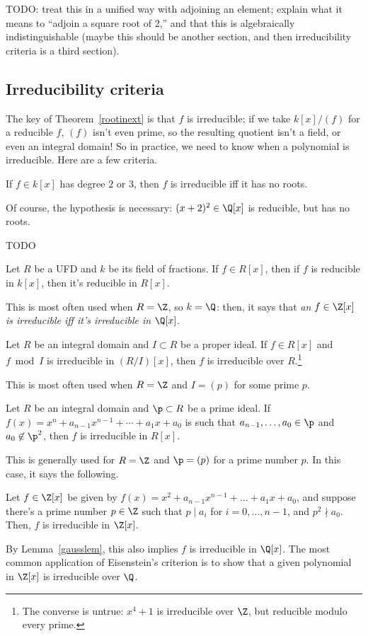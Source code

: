{\color{red}TODO}: treat this in a unified way with adjoining an element; explain what it means to ``adjoin a
square root of $2$,'' and that this is algebraically indistinguishable (maybe this should be another section, and
then irreducibility criteria is a third section).

\subsection*{Irreducibility criteria}
The key of Theorem~\ref{rootinext} is that $f$ is irreducible; if we take $k[x]/(f)$ for a reducible $f$,
$(f)$ isn't even prime, so the resulting quotient isn't a field, or even an integral domain! So in practice, we
need to know when a polynomial is irreducible. Here are a few criteria.
\begin{lem}
\label{cubirred}
If $f\in k[x]$ has degree $2$ or $3$, then $f$ is irreducible iff it has no roots.
\end{lem}
Of course, the hypothesis is necessary: $(x+2)^2\in\Q[x]$ is reducible, but has no roots.
\begin{thm}
{\color{red}TODO}
\end{thm}
\begin{lem}
\label{gausslem}
Let $R$ be a UFD and $k$ be its field of fractions. If $f\in R[x]$, then if $f$ is reducible in $k[x]$, then it's
reducible in $R[x]$.
\end{lem}
This is most often used when $R = \Z$, so $k = \Q$: then, it says that \emph{an $f\in\Z[x]$ is irreducible iff it's
irreducible in $\Q[x]$}.
\begin{prop}
Let $R$ be an integral domain and $I\subset R$ be a proper ideal. If $f\in R[x]$ and $f\bmod I$ is irreducible in
$(R/I)[x]$, then $f$ is irreducible over $R$.\footnote{The converse is untrue: $x^4+1$ is irreducible over $\Z$,
but reducible modulo every prime.}
\end{prop}
This is most often used when $R = \Z$ and $I = (p)$ for some prime $p$.
\begin{prop}
Let $R$ be an integral domain and $\p\subset R$ be a prime ideal. If $f(x) = x^n + a_{n-1}x^{n-1} + \dotsb + a_1x +
a_0$ is such that $a_{n-1},\dotsc,a_0\in\p$ and $a_0\not\in\p^2$, then $f$ is irreducible in $R[x]$.
\end{prop}
This is generally used for $R = \Z$ and $\p = (p)$ for a prime number $p$. In this case, it says the following.
\begin{coro}
Let $f\in\Z[x]$ be given by $f(x) = x^2 + a_{n-1}x^{n-1} + \dotsc + a_1x + a_0$, and suppose there's a prime number
$p\in\Z$ such that $p\mid a_i$ for $i = 0,\dotsc,n-1$, and $p^2\nmid a_0$. Then, $f$ is irreducible in $\Z[x]$.
\end{coro}
By Lemma~\ref{gausslem}, this also implies $f$ is irreducible in $\Q[x]$. The most common application of
Eisenstein's criterion is to show that a given polynomial in $\Z[x]$ is irreducible over $\Q$.

